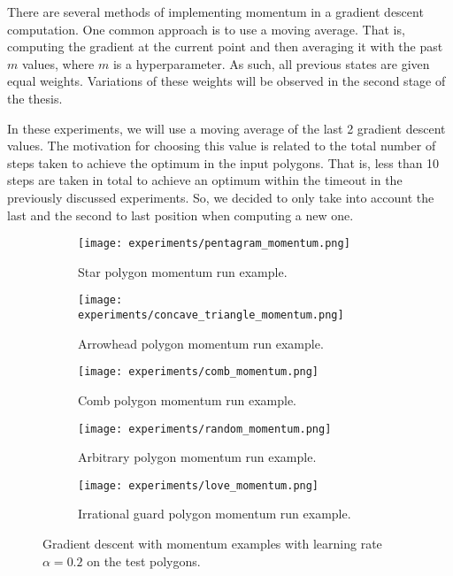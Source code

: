 There are several methods of implementing momentum in a gradient descent computation. One common approach is to use a moving average. That is, computing the gradient at the current point and then averaging it with the past $m$ values, where $m$ is a hyperparameter. As such, all previous states are given equal weights. Variations of these weights will be observed in the second stage of the thesis.

In these experiments, we will use a moving average of the last 2 gradient descent values. The motivation for choosing this value is related to the total number of steps taken to achieve the optimum in the input polygons. That is, less than 10 steps are taken in total to achieve an optimum within the timeout in the previously discussed experiments. So, we decided to only take into account the last and the second to last position when computing a new one.

\begin{figure}[h!]
    \centering
    \begin{subfigure}{0.45\textwidth}
        \centering
        \texttt{[image: experiments/pentagram\_momentum.png]}
        \caption{Star polygon momentum run example.}
        \label{fig:star_momentum}
    \end{subfigure}
    \begin{subfigure}{0.45\textwidth}
        \centering
        \texttt{[image: experiments/concave\_triangle\_momentum.png]}
        \caption{Arrowhead polygon momentum run example.}
        \label{fig:concave_momentum}
    \end{subfigure}
    \begin{subfigure}{0.45\textwidth}
        \centering
        \texttt{[image: experiments/comb\_momentum.png]}
        \caption{Comb polygon momentum run example.}
        \label{fig:comb_momentum}
    \end{subfigure}
    \begin{subfigure}{0.45\textwidth}
        \centering
        \texttt{[image: experiments/random\_momentum.png]}
        \caption{Arbitrary polygon momentum run example.}
        \label{fig:random_momentum}
    \end{subfigure}
    \begin{subfigure}{\textwidth}
        \centering
        \texttt{[image: experiments/love\_momentum.png]}
        \caption{Irrational guard polygon momentum run example.}
        \label{fig:love_momentum}
    \end{subfigure}
    \caption{Gradient descent with momentum examples with learning rate $\alpha = 0.2$ on the test polygons.}
    \label{fig:momentums}
\end{figure}


